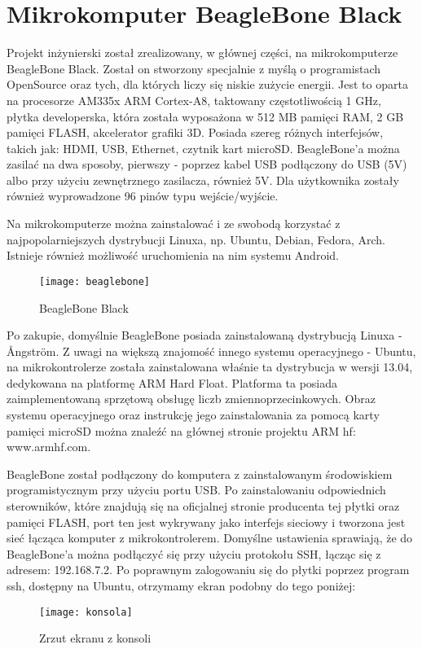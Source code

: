 \chapter{Mikrokomputer BeagleBone Black}
Projekt inżynierski został zrealizowany, w głównej części, na mikrokomputerze BeagleBone Black. Został on stworzony specjalnie z myślą o programistach OpenSource oraz tych, dla których liczy się niskie zużycie energii. Jest to oparta na procesorze AM335x ARM Cortex-A8, taktowany częstotliwością 1 GHz, płytka developerska, która została wyposażona w 512 MB pamięci RAM, 2 GB pamięci FLASH, akcelerator grafiki 3D. Posiada szereg różnych interfejsów, takich jak: HDMI, USB, Ethernet, czytnik kart microSD. BeagleBone'a można zasilać na dwa sposoby, pierwszy - poprzez kabel USB podłączony do USB (5V) albo przy użyciu zewnętrznego zasilacza, również 5V. Dla użytkownika zostały również wyprowadzone 96 pinów typu wejście/wyjście.

Na mikrokomputerze można zainstalować i ze swobodą korzystać z najpopolarniejszych dystrybucji Linuxa, np. Ubuntu, Debian, Fedora, Arch. Istnieje również możliwość uruchomienia na nim systemu Android.

\begin{figure}[h]
\centering
\texttt{[image: beaglebone]}
\caption{BeagleBone Black}
\label{fig:beaglebone}
\end{figure}

Po zakupie, domyślnie BeagleBone posiada zainstalowaną dystrybucją Linuxa - Ångström. Z uwagi na większą znajomość innego systemu operacyjnego - Ubuntu, na mikrokontrolerze została zainstalowana właśnie ta dystrybucja w wersji 13.04, dedykowana na platformę ARM Hard Float. Platforma ta posiada zaimplementowaną sprzętową obsługę liczb zmiennoprzecinkowych. Obraz systemu operacyjnego oraz instrukcję jego zainstalowania za pomocą karty pamięci microSD można znaleźć na głównej stronie projektu ARM hf: www.armhf.com.

BeagleBone został podłączony do komputera z zainstalowanym środowiskiem programistycznym przy użyciu portu USB. Po zainstalowaniu odpowiednich sterowników, które znajdują się na oficjalnej stronie producenta tej płytki oraz pamięci FLASH, port ten jest wykrywany jako interfejs sieciowy i tworzona jest sieć łącząca komputer z mikrokontrolerem. Domyślne ustawienia sprawiają, że do BeagleBone'a można podłączyć się przy użyciu protokołu SSH, łącząc się z adresem: 192.168.7.2. Po poprawnym zalogowaniu się do płytki poprzez program ssh, dostępny na Ubuntu, otrzymamy ekran podobny do tego poniżej:

\begin{figure}[h]
\centering
\texttt{[image: konsola]}
\caption{Zrzut ekranu z konsoli}
\label{fig:konsola}
\end{figure}